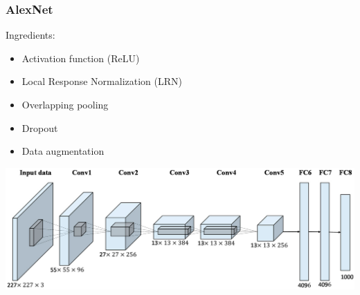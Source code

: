 \begin{frame}
	\frametitle{AlexNet}


	\bigskip

	 Ingredients:
	 \begin{itemize}
	 	\item Activation function (ReLU)
	 	\item Local Response Normalization (LRN)
	 	\item Overlapping pooling
	 	\item Dropout
	 	\item Data augmentation
	 \end{itemize}

 \bigskip

\begin{center}
	\includegraphics[scale=0.6]{figs/AlexNet}
\end{center}

\end{frame}

